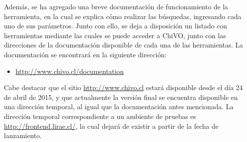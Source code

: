 Además, se ha agregado una breve documentación de funcionamiento de la herramienta, en la cual se explica cómo realizar las búsquedas, ingresando cada uno de sus parámetros. Junto con ello, se deja a disposición un listado con herramientas mediante las cuales se puede acceder a ChiVO, junto con las direcciones de la documentación disponible de cada una de las herramientas. La documentación se encontrará en la siguiente dirección:

\begin{itemize}
	\item \url{http://www.chivo.cl/documentation}
\end{itemize}

Cabe destacar que el sitio \url{http://www.chivo.cl} estará disponible desde el día 24 de abril de 2015, y que actualmente la versión final se encuentra disponible en una dirección temporal, al igual que la documentación antes mencionada. La dirección temporal correspondiente a un ambiente de pruebas es \url{http://frontend.lirae.cl/}, la cual dejará de existir a partir de la fecha de lanzamiento.
